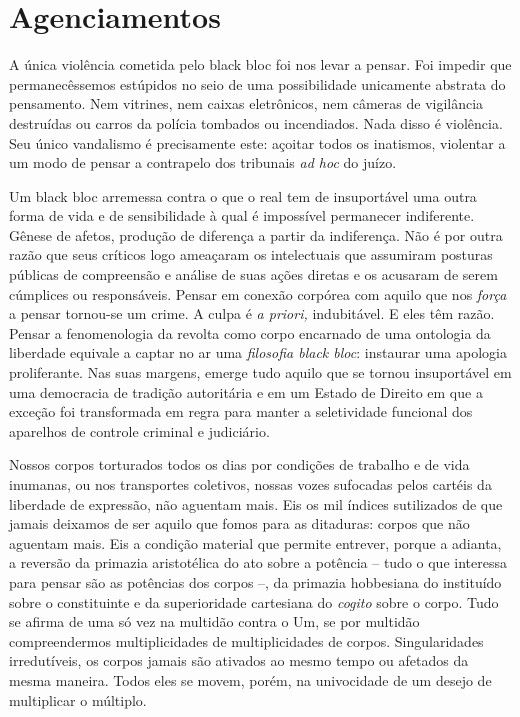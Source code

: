 
\section{Agenciamentos}

A única violência cometida pelo black bloc foi
nos levar a pensar. Foi impedir que permanecêssemos estúpidos no seio de
uma possibilidade unicamente abstrata do pensamento. Nem vitrines, nem
caixas eletrônicos, nem câmeras de vigilância destruídas ou carros da
polícia tombados ou incendiados. Nada disso é violência. Seu único
vandalismo é precisamente este: açoitar todos os inatismos, violentar a
um modo de pensar a contrapelo dos tribunais \emph{ad hoc} do juízo.

Um black bloc arremessa contra o que o real tem de insuportável uma
outra forma de vida e de sensibilidade à qual é impossível permanecer
indiferente. Gênese de afetos, produção de diferença a partir da
indiferença. Não é por outra razão que seus críticos logo ameaçaram os
intelectuais que assumiram posturas públicas de compreensão e análise de
suas ações diretas e os acusaram de serem cúmplices ou responsáveis.
Pensar em conexão corpórea com aquilo que nos \emph{força }a pensar
tornou-se um crime. A culpa é \emph{a priori, }indubitável. E eles têm
razão. Pensar a fenomenologia da revolta como corpo encarnado de uma
ontologia da liberdade equivale a captar no ar uma \emph{filosofia black
bloc}: instaurar uma apologia proliferante. Nas suas margens, emerge
tudo aquilo que se tornou insuportável em uma democracia de tradição
autoritária e em um Estado de Direito em que a exceção foi transformada
em regra para manter a seletividade funcional dos aparelhos de controle
criminal e judiciário.

Nossos corpos torturados todos os dias por condições de trabalho e de
vida inumanas, ou nos transportes coletivos, nossas vozes sufocadas
pelos cartéis da liberdade de expressão, não aguentam mais. Eis os mil
índices sutilizados de que jamais deixamos de ser aquilo que fomos para
as ditaduras: corpos que não aguentam mais. Eis a condição material que
permite entrever, porque a adianta, a reversão da primazia aristotélica
do ato sobre a potência -- tudo o que interessa para pensar são as
potências dos corpos --, da primazia hobbesiana do instituído sobre o
constituinte e da superioridade cartesiana do \emph{cogito }sobre o
corpo. Tudo se afirma de uma só vez na multidão contra o Um, se por
multidão compreendermos multiplicidades de multiplicidades de corpos.
Singularidades irredutíveis, os corpos jamais são ativados ao mesmo
tempo ou afetados da mesma maneira. Todos eles se movem, porém, na
univocidade de um desejo de multiplicar o múltiplo.

